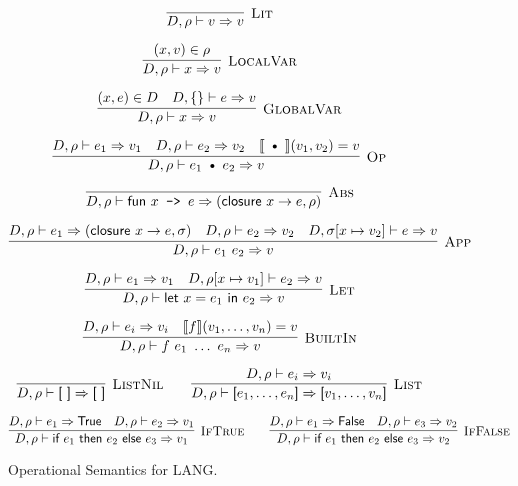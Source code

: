 \documentclass{article}
\def\code#1{\texttt{#1}}
\def\codesf#1{\textsf{#1}}
\def\rt{\Rightarrow}
\def\binop{\ \text{\textbullet}\ }
\def\envj#1#2#3{D, #1 \vdash #2 \rt #3}
\def\sem#1{\llbracket #1 \rrbracket}
\begin{document}
\begin{figure*}[h]
$$
\infer[\textsc{Lit}]{
	D,\rho \vdash v \Rightarrow v
}{
}
$$

$$
\infer[\textsc{LocalVar}]{
	D,\rho \vdash x \Rightarrow v
}{
	(x,v) \in \rho
}
$$

$$
\infer[\textsc{GlobalVar}]{
	D,\rho \vdash x \Rightarrow v
}{
	(x,e) \in D
	&
	D,\{\} \vdash e \Rightarrow v
}
$$

$$
\infer[\textsc{Op}]{
	D,\rho \vdash e_1 \binop e_2 \Rightarrow v
}{
	D,\rho \vdash e_1 \Rightarrow v_1
	&
	D,\rho \vdash e_2 \Rightarrow v_2
	&
	\llbracket \binop\rrbracket(v_1,v_2) = v
}
$$

$$
\infer[\textsc{Abs}]{
	D,\rho \vdash \codesf{fun } x\code{ -> } e \Rightarrow (\codesf{closure}\ x\to e,\rho)
}{
}
$$

$$
\infer[\textsc{App}]{
	D,\rho \vdash e_1\ e_2 \Rightarrow v
}{
	D,\rho \vdash e_1 \Rightarrow (\codesf{closure}\ x\to e,\sigma)
	&
	D,\rho \vdash e_2 \Rightarrow v_2
	&
	D,\sigma[x\mapsto v_2] \vdash e \Rightarrow v
}
$$

$$
\infer[\textsc{Let}]{
	D,\rho \vdash \codesf{let}\ x=e_1\ \codesf{in}\ e_2 \Rightarrow v
}{
	D,\rho \vdash e_1 \Rightarrow v_1
	&
	D,\rho[x\mapsto v_1] \vdash e_2 \Rightarrow v
}
$$

$$
\infer[\textsc{BuiltIn}]{
	\envj{\rho}{f \ e_1 \ \ldots \ e_n}{v}
}{
	\envj{\rho}{e_i}{v_i}
	&
	\sem{f}(v_1,\ldots,v_n)=v
}
$$

$$
\infer[\textsc{ListNil}]{
	\envj{\rho}{\codesf{[ ]}}{\codesf{[ ]}}
}{}
\qquad
\infer[\textsc{List}]{
	\envj{\rho}{\codesf{[}e_1,\ldots,e_n\codesf ]}{\codesf [v_1,\ldots,v_n\codesf ]}
}{
	\envj{\rho}{e_i}{v_i}
}
$$

$$
\infer[\textsc{IfTrue}]{
	D,\rho \vdash \codesf{if}\ e_1\ \codesf{then}\ e_2\ \codesf{else}\ e_3 \Rightarrow v_1
}{
	D,\rho \vdash e_1 \Rightarrow \codesf{True}
	&
	D,\rho \vdash e_2 \Rightarrow v_1
}
\qquad
\infer[\textsc{IfFalse}]{
	D,\rho \vdash \codesf{if}\ e_1\ \codesf{then}\ e_2\ \codesf{else}\ e_3 \Rightarrow v_2
}{
	D,\rho \vdash e_1 \Rightarrow \codesf{False}
	&
	D,\rho \vdash e_3 \Rightarrow v_2
}
$$

\caption{Operational Semantics for LANG.}
\end{figure*}

\end{document}
